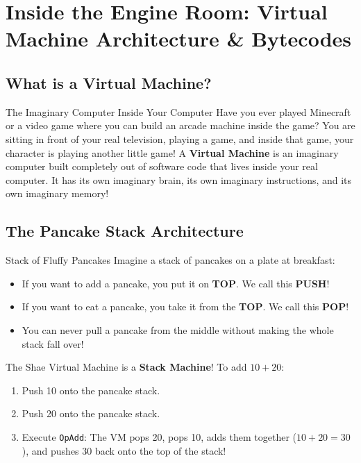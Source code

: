 \chapter{Inside the Engine Room: Virtual Machine Architecture \& Bytecodes}

\section{What is a Virtual Machine?}

\begin{kidbox}{The Imaginary Computer Inside Your Computer}
Have you ever played Minecraft or a video game where you can build an arcade machine inside the game?
You are sitting in front of your real television, playing a game, and inside that game, your character is playing another little game!
A \textbf{Virtual Machine} is an imaginary computer built completely out of software code that lives inside your real computer.
It has its own imaginary brain, its own imaginary instructions, and its own imaginary memory!
\end{kidbox}

\section{The Pancake Stack Architecture}

\begin{kidbox}{Stack of Fluffy Pancakes}
Imagine a stack of pancakes on a plate at breakfast:
\begin{itemize}
    \item If you want to add a pancake, you put it on \textbf{TOP}. We call this \textbf{PUSH}!
    \item If you want to eat a pancake, you take it from the \textbf{TOP}. We call this \textbf{POP}!
    \item You can never pull a pancake from the middle without making the whole stack fall over!
\end{itemize}
The Shae Virtual Machine is a \textbf{Stack Machine}! 
To add $10 + 20$:
\begin{enumerate}
    \item Push 10 onto the pancake stack.
    \item Push 20 onto the pancake stack.
    \item Execute \texttt{OpAdd}: The VM pops 20, pops 10, adds them together ($10 + 20 = 30$), and pushes 30 back onto the top of the stack!
\end{enumerate}
\end{kidbox}

